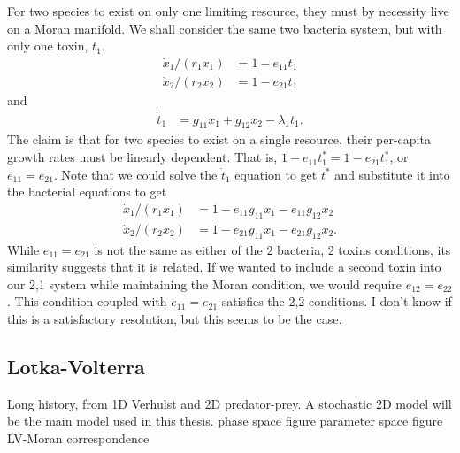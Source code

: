 \documentclass[a4paper,11pt]{article}
\numberwithin{equation}{section} %
\begin{document}
For two species to exist on only one limiting resource, they must by necessity live on a Moran manifold. 
We shall consider the same two bacteria system, but with only one toxin, $t_1$. 
\begin{align*}
\dot{x}_1/(r_1 x_1) &= 1 - e_{11} t_1 \\
\dot{x}_2/(r_2 x_2) &= 1 - e_{21} t_1
\end{align*}
and
\begin{align*}
\dot{t}_1 &= g_{11}x_1+g_{12}x_2 - \lambda_1 t_1. 
\end{align*}
The claim is that for two species to exist on a single resource, their per-capita growth rates must be linearly dependent. 
That is, $1-e_{11}t^*_1=1-e_{21}t^*_1$, or $e_{11}=e_{21}$. 
Note that we could solve the $\dot{t}_1$ equation to get $t^*$ and substitute it into the bacterial equations to get
\begin{align*}
\dot{x}_1/(r_1 x_1) &= 1 - e_{11}g_{11} x_1 - e_{11}g_{12} x_2 \\
\dot{x}_2/(r_2 x_2) &= 1 - e_{21}g_{11} x_1 - e_{21}g_{12} x_2. 
\end{align*}
While $e_{11}=e_{21}$ is not the same as either of the 2 bacteria, 2 toxins conditions, its similarity suggests that it is related. 
If we wanted to include a second toxin into our 2,1 system while maintaining the Moran condition, we would require $e_{12}=e_{22}$. 
This condition coupled with $e_{11}=e_{21}$ satisfies the 2,2 conditions. 
I don't know if this is a satisfactory resolution, but this seems to be the case. 

\subsection{Lotka-Volterra}
Long history, from 1D Verhulst and 2D predator-prey. 
A stochastic 2D model will be the main model used in this thesis. 
phase space figure
parameter space figure
LV-Moran correspondence
\end{document}

